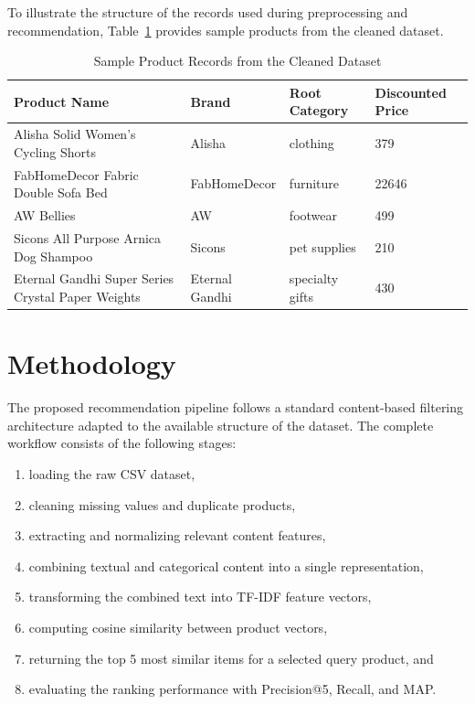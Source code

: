 \documentclass[conference]{IEEEtran}
\begin{document}
To illustrate the structure of the records used during preprocessing and recommendation, Table~\ref{tab:sample_products} provides sample products from the cleaned dataset.

\begin{table}[!t]
\caption{Sample Product Records from the Cleaned Dataset}
\label{tab:sample_products}
\centering
\begin{tabular}{|p{}|p{}|p{}|p{}|}
\hline
\textbf{Product Name} & \textbf{Brand} & \textbf{Root Category} & \textbf{Discounted Price} \\
\hline
Alisha Solid Women's Cycling Shorts & Alisha & clothing & 379 \\
\hline
FabHomeDecor Fabric Double Sofa Bed & FabHomeDecor & furniture & 22646 \\
\hline
AW Bellies & AW & footwear & 499 \\
\hline
Sicons All Purpose Arnica Dog Shampoo & Sicons & pet supplies & 210 \\
\hline
Eternal Gandhi Super Series Crystal Paper Weights & Eternal Gandhi & specialty gifts & 430 \\
\hline
\end{tabular}
\end{table}

\section{Methodology}
The proposed recommendation pipeline follows a standard content-based filtering architecture adapted to the available structure of the dataset. The complete workflow consists of the following stages:

\begin{enumerate}
\item loading the raw CSV dataset,
\item cleaning missing values and duplicate products,
\item extracting and normalizing relevant content features,
\item combining textual and categorical content into a single representation,
\item transforming the combined text into TF-IDF feature vectors,
\item computing cosine similarity between product vectors,
\item returning the top 5 most similar items for a selected query product, and
\item evaluating the ranking performance with Precision@5, Recall, and MAP.
\end{enumerate}
\end{document}
